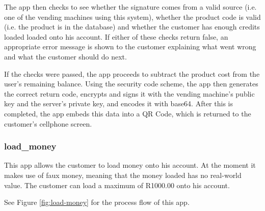 The app then checks to see whether the signature comes from a valid source (i.e.
one of the vending machines using this system), whether the product code is
valid (i.e. the product is in the database) and whether the customer has enough
credits loaded loaded onto his account. If either of these checks return false,
an appropriate error message is shown to the customer explaining what went wrong
and what the customer should do next.

If the checks were passed, the app proceeds to subtract the product cost from
the user's remaining balance. Using the security code scheme, the app then
generates the correct return code, encrypts and signs it with the vending
machine's public key and the server's private key, and encodes it with base64.
After this is completed, the app embeds this data into a QR Code, which is
returned to the customer's cellphone screen.

\subsubsection{load\_money}

This app allows the customer to load money onto his account. At the moment it
makes use of faux money, meaning that the money loaded has no real-world value.
The customer can load a maximum of R1000.00 onto his account.

See Figure \ref{fig:load-money} for the process flow of this app.

